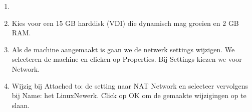 \begin{enumerate}
	\item 
		\begin{minipage}[t]{\linewidth}
		\raggedright
		\end{minipage}
	\item Kies voor een 15 GB harddisk (VDI) die dynamisch mag groeien en 2 GB RAM.

	\item Als de machine aangemaakt is gaan we de netwerk settings wijzigen. We selecteren de machine en clicken op Properties. Bij Settings kiezen we voor Network.
	\item
		\begin{minipage}[t]{\linewidth}
		\raggedright
		Wijzig bij Attached to: de setting naar NAT Network en selecteer vervolgens bij Name: het LinuxNewerk. Click op OK om de gemaakte wijzigingen op te slaan.
		\end{minipage}

\end{enumerate}
